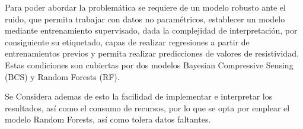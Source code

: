 Para poder abordar la problemática se requiere de un modelo robusto ante el ruido, que permita trabajar con datos no paramétricos, establecer un modelo mediante entrenamiento supervisado, dada la complejidad de interpretación, por consiguiente su etiquetado, capas de realizar regresiones a partir de entrenamientos previos y permita realizar predicciones de valores de resistividad. Estas condiciones son cubiertas por dos modelos Bayesian Compressive Sensing (BCS) y Random Forests (RF).

Se Considera ademas de esto la facilidad de implementar e interpretar los resultados, así como el consumo de recursos, por lo que se opta por emplear el modelo Random Forests, así como tolera datos faltantes.
